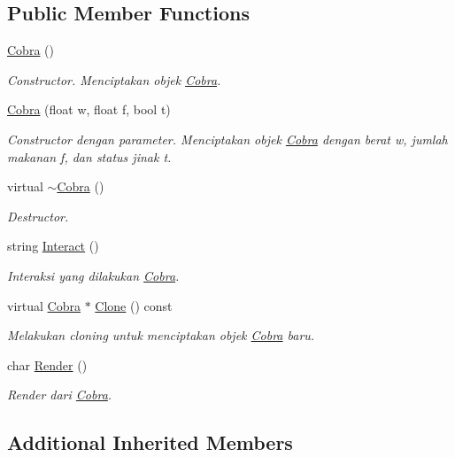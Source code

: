 \subsection*{Public Member Functions}
\begin{DoxyCompactItemize}
\item 
\hyperlink{classCobra_acc0ec4a84ca7a0ea5e53aa1e8cabd268}{Cobra} ()
\begin{DoxyCompactList}\small\item\em Constructor. Menciptakan objek \hyperlink{classCobra}{Cobra}. \end{DoxyCompactList}\item 
\hyperlink{classCobra_ad1df7df30cea151706031ee0b9f28abd}{Cobra} (float w, float f, bool t)
\begin{DoxyCompactList}\small\item\em Constructor dengan parameter. Menciptakan objek \hyperlink{classCobra}{Cobra} dengan berat w, jumlah makanan f, dan status jinak t. \end{DoxyCompactList}\item 
virtual \hyperlink{classCobra_ac109599e6a8c9a01e852c54fb6fa2687}{$\sim$\+Cobra} ()
\begin{DoxyCompactList}\small\item\em Destructor. \end{DoxyCompactList}\item 
string \hyperlink{classCobra_aa8dd0878e3d654e51bec9592c88bcab5}{Interact} ()
\begin{DoxyCompactList}\small\item\em Interaksi yang dilakukan \hyperlink{classCobra}{Cobra}. \end{DoxyCompactList}\item 
virtual \hyperlink{classCobra}{Cobra} $\ast$ \hyperlink{classCobra_a1bfd2035a0a700b6362b1853cb12949b}{Clone} () const 
\begin{DoxyCompactList}\small\item\em Melakukan cloning untuk menciptakan objek \hyperlink{classCobra}{Cobra} baru. \end{DoxyCompactList}\item 
char \hyperlink{classCobra_abca7da2ee55ce825dc49f4f9a3e87208}{Render} ()
\begin{DoxyCompactList}\small\item\em Render dari \hyperlink{classCobra}{Cobra}. \end{DoxyCompactList}\end{DoxyCompactItemize}
\subsection*{Additional Inherited Members}



